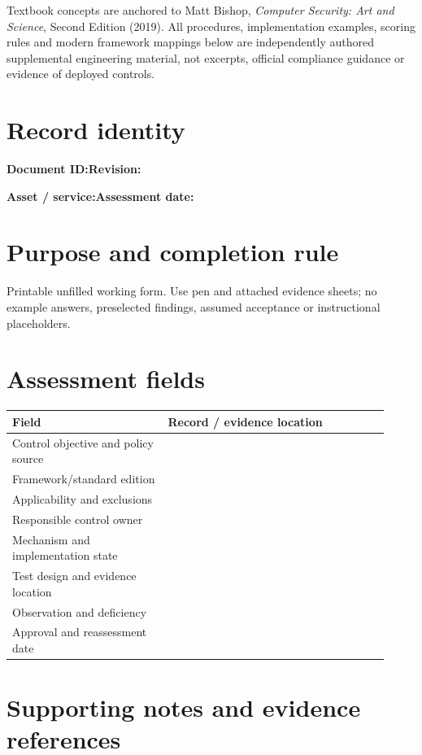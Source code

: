 \documentclass[10pt,letterpaper]{article}
\begin{document}
\makedoctocpage
\begin{notebox}
Textbook concepts are anchored to Matt Bishop, \emph{Computer Security: Art and Science}, Second Edition (2019). All procedures, implementation examples, scoring rules and modern framework mappings below are independently authored supplemental engineering material, not excerpts, official compliance guidance or evidence of deployed controls.
\end{notebox}
\section{Record identity}
\textbf{Document ID:}\enspace\hrulefill\quad\textbf{Revision:}\enspace\hrulefill
\par\medskip\textbf{Asset / service:}\enspace\hrulefill\quad\textbf{Assessment date:}\enspace\hrulefill
\section{Purpose and completion rule}
Printable unfilled working form. Use pen and attached evidence sheets; no example answers, preselected findings, assumed acceptance or instructional placeholders.
\section{Assessment fields}
\renewcommand{\arraystretch}{1.8}
\begin{longtable}{@{}p{0.38\linewidth}p{0.54\linewidth}@{}}
\toprule\textbf{Field}&\textbf{Record / evidence location}\\\midrule\endhead
Control objective and policy source & \rule{0pt}{1.3cm}\\\midrule
Framework/standard edition & \rule{0pt}{1.3cm}\\\midrule
Applicability and exclusions & \rule{0pt}{1.3cm}\\\midrule
Responsible control owner & \rule{0pt}{1.3cm}\\\midrule
Mechanism and implementation state & \rule{0pt}{1.3cm}\\\midrule
Test design and evidence location & \rule{0pt}{1.3cm}\\\midrule
Observation and deficiency & \rule{0pt}{1.3cm}\\\midrule
Approval and reassessment date & \rule{0pt}{1.3cm}\\\midrule
\bottomrule\end{longtable}
\section{Supporting notes and evidence references}
\end{document}
